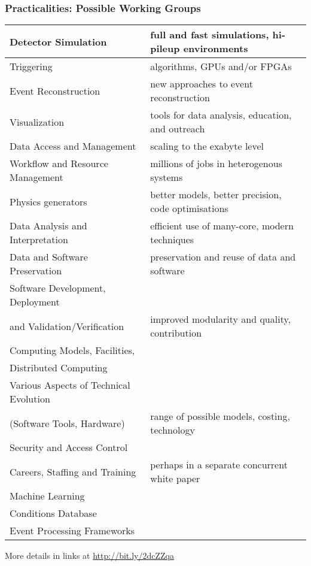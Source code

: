 \begin{frame}
\frametitle{Practicalities: Possible Working Groups}
\begin{table}[h!]
\tiny
\centering
\label{tab:table1}
\begin{tabular}{|l|l|}
\hline
Detector Simulation & full and fast simulations, hi-pileup environments \\ \hline

Triggering & algorithms, GPUs and/or FPGAs \\ \hline

Event Reconstruction & new approaches to event reconstruction \\ \hline

Visualization & tools for data analysis, education, and outreach \\ \hline

Data Access and Management & scaling to the exabyte level \\ \hline

Workflow and Resource Management & millions of jobs in heterogenous systems \\ \hline

Physics generators & better models, better precision, code optimisations \\ \hline

Data Analysis and Interpretation & efficient use of many-core, modern techniques \\ \hline

Data and Software Preservation & preservation and reuse of data and software \\ \hline

Software Development, Deployment & \\
and Validation/Verification & improved modularity and quality, contribution \\ \hline

Computing Models, Facilities, & \\
Distributed Computing & \\ 
Various Aspects of Technical Evolution & \\ 
(Software Tools, Hardware) & range of possible models, costing, technology \\ \hline

Security and Access Control & \\ \hline

Careers, Staffing and Training & perhaps in a separate concurrent white paper \\ \hline

Machine Learning & \\ \hline

Conditions Database & \\ \hline

Event Processing Frameworks & \\ \hline
\end{tabular}
\end{table}

\begin{center}
\small{More details in links at \color{blue} {\url{http://bit.ly/2dcZZqa}}}
\end{center}

\end{frame}


